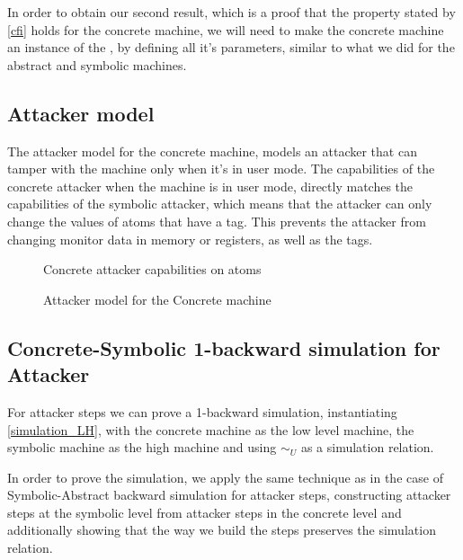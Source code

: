 In order to obtain our second result, which is a proof that the
property stated by \cref{cfi} holds for the concrete machine, we will
need to make the concrete machine an instance of
the , by defining all it's parameters, similar
to what we did for the abstract and symbolic machines.

\subsection{Attacker model}\label{sec:concrete_attacker}

The attacker model for the concrete machine, models an attacker that
can tamper with the machine only when it's in user mode. The
capabilities of the concrete attacker when the machine is in user
mode, directly matches the capabilities of the symbolic attacker,
which means that the attacker can only change the values of atoms that
have a \USERname tag. This prevents the attacker from changing monitor
data in memory or registers, as well as the tags.

\begin{figure}[htb!]
\caption{Concrete attacker capabilities on atoms}
\label{concrete_attacker_atom}
\end{figure}

\begin{figure}[htb!]
\caption{Attacker model for the Concrete machine}
\label{concrete_attacker}
\end{figure}

\subsection{Concrete-Symbolic 1-backward simulation for Attacker}
\label{sec:backward_CS_attacker}

For attacker steps we can prove a 1-backward simulation, instantiating
\cref{simulation_LH}, with the concrete machine as the low level machine,
the symbolic machine as the high machine and using $\sim_U$ as a simulation
relation.

In order to prove the simulation, we apply the same technique as in the
case of Symbolic-Abstract backward simulation for attacker steps, constructing
attacker steps at the symbolic level from attacker steps in the concrete level
and additionally showing that the way we build the steps preserves the simulation
relation.

